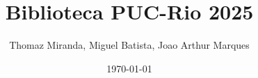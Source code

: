 \documentclass[11pt, a4paper, twoside]{article}
\title{Biblioteca PUC-Rio 2025}
\author{Thomaz Miranda, Miguel Batista, Joao Arthur Marques}
\date{\today}
\begin{document}
\twocolumn
\maketitle

\renewcommand{\contentsname}{Índice}
\tableofcontents
\end{document}
